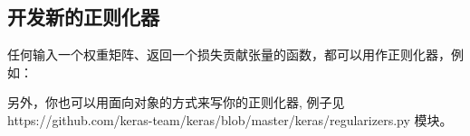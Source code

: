 \subsection{开发新的正则化器}\label{ux5f00ux53d1ux65b0ux7684ux6b63ux5219ux5316ux5668}

任何输入一个权重矩阵、返回一个损失贡献张量的函数，都可以用作正则化器，例如：

\begin{Shaded}
\begin{Highlighting}[]
   

 
      \OperatorTok{*} 

\OperatorTok{=}\NormalTok{,}
                \OperatorTok{=}
\end{Highlighting}
\end{Shaded}

另外，你也可以用面向对象的方式来写你的正则化器, 例子见 https://github.com/keras-team/keras/blob/master/keras/regularizers.py 模块。

\newpage

